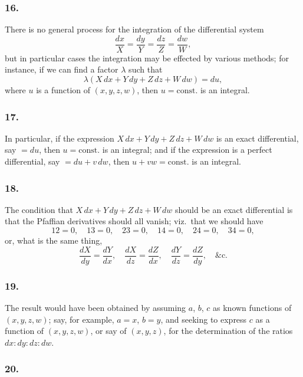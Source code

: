 \documentclass[11pt,a4paper]{book}
\begin{document}
\newpage
\setcounter{page}{121}

\subsubsection*{16.}

There is no general process for the integration of the differential system
\[
\frac{dx}{X} = \frac{dy}{Y} = \frac{dz}{Z} = \frac{dw}{W},
\]
but in particular cases the integration may be effected by various methods; for instance, if we can find a factor $\lambda$ such that
\[
\lambda(X\,dx + Y\,dy + Z\,dz + W\,dw) = du,
\]
where $u$ is a function of $(x, y, z, w)$, then $u = \text{const.}$ is an integral.

\subsubsection*{17.}

In particular, if the expression $X\,dx + Y\,dy + Z\,dz + W\,dw$ is an exact differential, say $= du$, then $u = \text{const.}$ is an integral; and if the expression is a perfect differential, say $= du + v\,dw$, then $u + vw = \text{const.}$ is an integral.

\subsubsection*{18.}

The condition that $X\,dx + Y\,dy + Z\,dz + W\,dw$ should be an exact differential is that the Pfaffian derivatives should all vanish; viz.~that we should have
\[
12 = 0, \quad 13 = 0, \quad 23 = 0, \quad 14 = 0, \quad 24 = 0, \quad 34 = 0,
\]
or, what is the same thing,
\[
\frac{dX}{dy} = \frac{dY}{dx}, \quad \frac{dX}{dz} = \frac{dZ}{dx}, \quad \frac{dY}{dz} = \frac{dZ}{dy}, \quad \&\text{c.}
\]

\subsubsection*{19.}

The result would have been obtained by assuming $a$, $b$, $c$ as known functions of $(x, y, z, w)$; say, for example, $a = x$, $b = y$, and seeking to express $c$ as a function of $(x, y, z, w)$, or say of $(x, y, z)$, for the determination of the ratios $dx : dy : dz : dw$.

\subsubsection*{20.}
\end{document}
